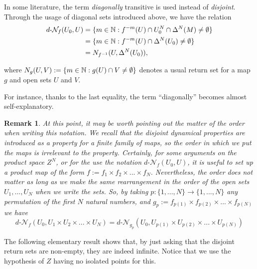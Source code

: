 \documentclass[11pt,reqno]{article}
\newtheorem{remark}[statement]{Remark}
\def\dret{d\text{-}\ret}
\def\ret{\mathcal{N}}
\def\NN{\Bbb N}
\def\eor{\hfill{\circledR}}
\begin{document}
In some literature, the term \textit{diagonally} transitive is used instead of \textit{disjoint}. Through the usage of diagonal sets introduced above, we have the relation
\begin{equation*}
\begin{split}
    \dret_f(U_0, U) &= \{m\in \NN :  f^{-m}(U)\cap U_0^N  \cap \Delta^N(M) \neq \emptyset\}\\
    &= \{m\in \NN :  f^{-m}(U)\cap  \Delta^N(U_0) \neq \emptyset\}\\
    &= N_{f^{-1}}(U,\Delta^N(U_0)), 
\end{split}
\end{equation*}

where $N_g(U,V):=\{m\in \NN : g(U)\cap V \neq \emptyset\}$ denotes a usual return set for a map $g$ and open sets $U$ and $V$. 


For instance, thanks to the last equality, the term ``diagonally'' becomes almost self-explanatory.

\begin{remark}
\rm
At this point, it may be worth pointing out the matter of the order when writing this notation. We recall that the disjoint dynamical properties are introduced as a property for a finite family of maps, so the order in which we put the maps is irrelevant to the property. Certainly, for some arguments on the product space $Z^N$, or for the use the notation $\dret_f(U_0, U)$, it is useful to set up a product map of the form $f:= f_1 \times f_2 \times ...\times f_N$. Nevertheless, the order does not matter as long as we make the same rearrangement in the order of the open sets $U_1,...,U_N$ when we write the sets. So, by taking $p:\{1,...,N\}\to \{1,...,N\} $ any permutation of the first $N$ natural numbers, and $g_p:=f_{p(1)} \times f_{p(2)} \times ...\times f_{p(N)}$ we have 
\[\dret_{f}(U_0,U_1\times U_2\times...\times U_N)=   \dret_{g_p}(U_0,U_{p(1)}\times U_{p(2)}\times...\times U_{p(N)})\]\eor
\end{remark}

The following elementary result shows that, by just asking that the disjoint return sets are non-empty, they are indeed infinite. Notice that we use the hypothesis of $Z$ having no isolated points for this. 
\end{document}
